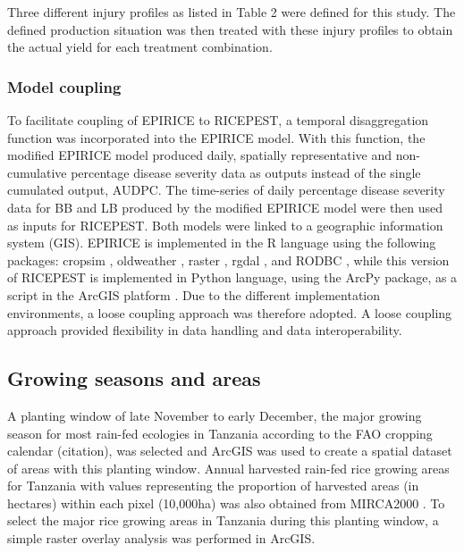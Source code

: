 \documentclass[preprint,12pt]{elsarticle}
\begin{document}
Three different injury profiles as listed in Table 2 were defined for this study. The defined production situation was then treated with these injury profiles to obtain the actual yield for each treatment combination.

\subsubsection{Model coupling}
To facilitate coupling of EPIRICE to RICEPEST, a temporal disaggregation function was incorporated into the EPIRICE model. With this function, the modified EPIRICE model produced daily, spatially representative and non-cumulative percentage disease severity data as outputs instead of the single cumulated output, AUDPC. The time-series of daily percentage disease severity data for BB and LB produced by the modified EPIRICE model were then used as inputs for RICEPEST. Both models were linked to a geographic information system (GIS). EPIRICE is implemented in the R language using the following packages: cropsim \cite{Hijmans2009}, oldweather \cite{Hijmans2009}, raster \cite{Hijmans2014}, rgdal \cite{Bivand2014}, and RODBC \cite{Ripley2013}, while this version of RICEPEST is implemented in Python language, using the ArcPy package, as a script in the ArcGIS platform \cite{ESRI2011}. Due to the different implementation environments, a loose coupling approach was therefore adopted. A loose coupling approach provided flexibility in data handling and data interoperability. 

\subsection{Growing seasons and areas}
A planting window of late November to early December, the major growing season for most rain-fed ecologies in Tanzania according to the FAO cropping calendar (citation), was selected and ArcGIS was used to create a spatial dataset of areas with this planting window. Annual harvested rain-fed rice growing areas for Tanzania with values representing the proportion of harvested areas (in hectares) within each pixel (10,000ha) was also obtained from MIRCA2000 \cite{Portmann2010}. To select the major rice growing areas in Tanzania during this planting window, a simple raster overlay analysis was performed in ArcGIS.
\end{document}
